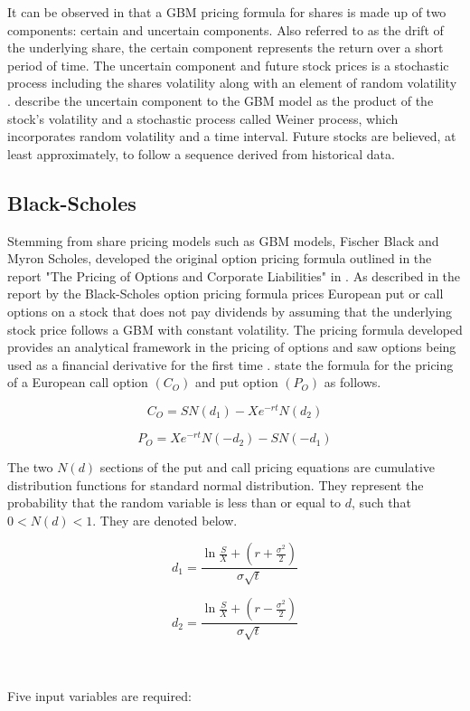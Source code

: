 \documentclass[12pt]{article}
\begin{document}
It can be observed in \citep{Australian} that a GBM pricing formula for shares is made up of two components: certain and uncertain components. Also referred to as the drift of the underlying share, the certain component represents the return over a short period of time. The uncertain component and future stock prices is a stochastic process including the shares volatility along with an element of random volatility \citep{Sengupta}. \citep{Brewer} describe the uncertain component to the GBM model as the product of the stock’s volatility and a stochastic process called Weiner process, which incorporates random volatility and a time interval. Future stocks are believed, at least approximately, to follow a sequence derived from historical data.

\subsection{Black-Scholes}
Stemming from share pricing models such as GBM models, Fischer Black and Myron Scholes, developed the original option pricing formula outlined in the report "The Pricing of Options and Corporate Liabilities" in \citep{BSReport}. As described in the report by \cite{Shinde} the Black-Scholes option pricing formula prices European put or call options on a stock that does not pay dividends by assuming that the underlying stock price follows a GBM with constant volatility. The pricing formula developed provides an analytical framework in the pricing of options and saw options being used as a financial derivative for the first time \citep{OptionPricing}. \cite{BSReport} state the formula for the pricing of a European call option $(C_O)$ and put option $(P_O)$ as follows.

\begin{equation} \label{BSCallFormula}
C_O = SN(d_1)-Xe^{-rt}N(d_2)
\end{equation}

\begin{equation} \label{BSPutFormula}
P_O = Xe^{-rt}N(-d_2)-SN(-d_1)
\end{equation}

The two $N(d)$ sections of the put and call pricing equations are cumulative distribution functions for standard normal distribution. They represent the probability that the random variable is less than or equal to $d$, such that $0 < N(d) < 1$. They are denoted below.

\begin{minipage}{0.40\linewidth}  
	\begin{equation} \label{d_1}
	d_1 = \frac{\ln{\frac{S}{X}} + (r+\frac{\sigma^2}{2})}{\sigma\sqrt{t}}  
	\end{equation}  
\end{minipage}  
\hspace{0.5cm}  
\begin{minipage}{0.40\linewidth}  
	\begin{equation} \label{d_2}
	d_2 = \frac{\ln{\frac{S}{X}} + (r-\frac{\sigma^2}{2})}{\sigma\sqrt{t}} 
	\end{equation}  
\end{minipage}
\\
\\
Five input variables are required:
\end{document}

